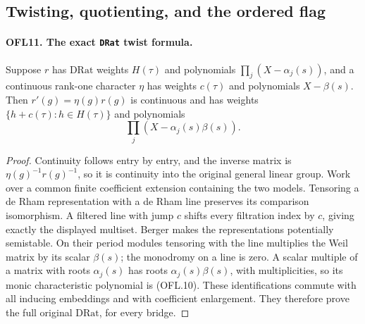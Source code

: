 \documentclass[11pt,a4paper]{article}
\numberwithin{equation}{section}
\theoremstyle{remark}\newtheorem{remark}[theorem]{Remark}
\begin{document}
\subsection{Twisting, quotienting, and the ordered flag}

\paragraph{OFL11. The exact \texttt{DRat} twist formula.}
\label{claim:OFL11}
Suppose \(r\) has \(\mathrm{DRat}\) weights \(H(\tau)\)
and polynomials \(\prod_j(X-\alpha_j(s))\), and a continuous
rank-one character \(\eta\) has weights \(c(\tau)\) and
polynomials \(X-\beta(s)\).  Then
\(r'(g)=\eta(g)r(g)\) is continuous and has weights
\(\{h+c(\tau):h\in H(\tau)\}\) and polynomials
\[
                    \prod_j(X-\alpha_j(s)\beta(s)).
 \tag{OFL.10}
\]
\begin{proof}
Continuity follows entry by entry, and the inverse matrix is
\(\eta(g)^{-1}r(g)^{-1}\), so it is continuity into the
original general linear group.  Work over a common finite
coefficient extension containing the two models.  Tensoring a de
Rham representation with a de Rham line preserves its comparison
isomorphism.  A filtered line with jump \(c\) shifts every
filtration index by \(c\), giving exactly the displayed multiset.
Berger makes the representations potentially semistable.  On
their period modules tensoring with the line multiplies the Weil
matrix by its scalar \(\beta(s)\); the monodromy on a line
is zero.  A scalar multiple of a matrix with roots
\(\alpha_j(s)\) has roots \(\alpha_j(s)\beta(s)\), with
multiplicities, so its monic characteristic polynomial is
(OFL.10).  These identifications commute with all inducing
embeddings and with coefficient enlargement.  They therefore
prove the full original \(\mathrm{DRat}\), for every bridge.
\end{proof}

\end{document}
